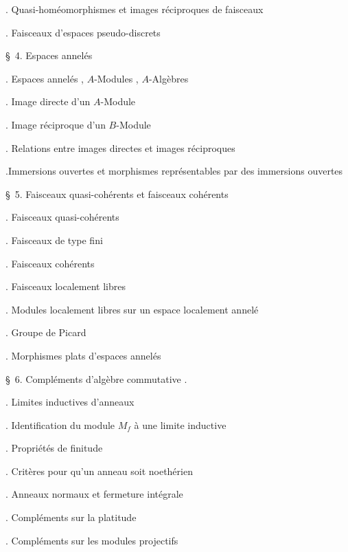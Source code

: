 
\noindent{}. Quasi-homéomorphismes et images réciproques de faisceaux\dotfill

\noindent{}. Faisceaux d'espaces pseudo-discrets\dotfill

\noindent\quad \S\ 4. Espaces annelés\dotfill

\noindent{}. Espaces annelés , $A$-Modules , $A$-Algèbres\dotfill

\noindent{}. Image directe d'un $A$-Module\dotfill

\noindent{}. Image réciproque d'un $B$-Module\dotfill

\noindent{}. Relations entre images directes et images réciproques\dotfill

\noindent{}.Immersions ouvertes et morphismes représentables par des immersions ouvertes \dotfill

\noindent\quad \S\ 5. Faisceaux quasi-cohérents et faisceaux cohérents\dotfill

\noindent{}. Faisceaux quasi-cohérents\dotfill

\noindent{}. Faisceaux de type fini\dotfill

\noindent{}. Faisceaux cohérents\dotfill

\noindent{}. Faisceaux localement libres\dotfill

\noindent{}. Modules localement libres sur un espace localement annelé\dotfill

\noindent{}. Groupe de Picard\dotfill

\noindent{}. Morphismes plats d'espaces annelés\dotfill

\noindent\quad \S\ 6. Compléments d'algèbre commutative .

\noindent{}. Limites inductives d'anneaux\dotfill

\noindent{}. Identification du module $M_f$ à une limite  inductive\dotfill

\noindent{}. Propriétés de finitude\dotfill

\noindent{}. Critères pour qu'un anneau soit noethérien\dotfill

\noindent{}. Anneaux normaux et fermeture intégrale\dotfill

\noindent{}. Compléments sur la platitude\dotfill

\noindent{}. Compléments sur les modules projectifs\dotfill

